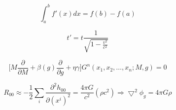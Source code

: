 $$
\int_a^b f'(x)dx = f(b) - f(a)
$$

$$
t' = t \frac{1}{\sqrt{1 - \frac{v^2}{c^2}}}
$$

$$
\Big[
    M \frac{\partial}{\partial M} +
    \beta(g) \frac{\partial}{\partial g} +
    \eta \gamma
\Big]
G^n(x_1, x_2, \dots, x_n; M, g) = 0
$$

$$
R_{00} \approx
    -\frac{1}{2}
    \sum_i
    \frac{\partial^2 h_{00}}{\partial(x^i)^2}
    =
    \frac{4\pi G}{c^2}
    (\rho c^2)
    \Rightarrow
    \bigtriangledown^2 \phi_g
    =
    4\pi G \rho
$$
